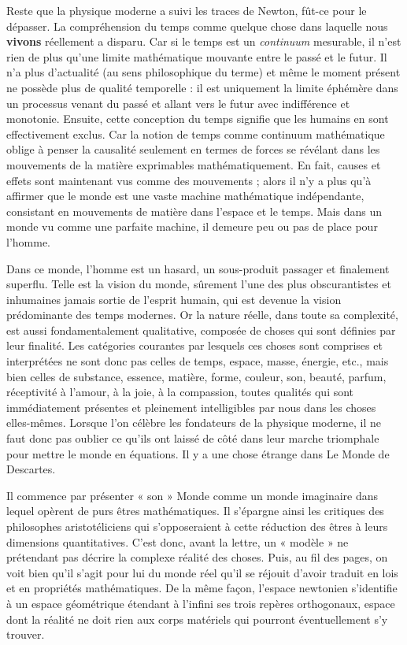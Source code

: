 \documentclass[a4paper,12pt]{article}
\begin{document}
Reste que la physique moderne a suivi les traces de Newton, fût-ce pour le dépasser. La compréhension du temps comme quelque chose dans laquelle nous  \textbf{vivons} réellement a disparu. Car si le temps est un  \textit{continuum} mesurable, il n'est rien de plus qu'une limite mathématique mouvante entre le passé et le futur. Il n'a plus d'actualité (au sens philosophique du terme) et même le moment présent ne possède plus de qualité temporelle : il est uniquement la limite éphémère dans un processus venant du passé et allant vers le futur avec indifférence et monotonie. Ensuite, cette conception du temps signifie que les humains en sont effectivement exclus. Car la notion de temps comme continuum mathématique oblige à penser la causalité seulement en termes de forces se révélant dans les mouvements de la matière exprimables mathématiquement. En fait, causes et effets sont maintenant vus comme des mouvements ; alors il n'y a plus qu'à affirmer que le monde est une vaste machine mathématique indépendante, consistant en mouvements de matière dans l'espace et le temps. Mais dans un monde vu comme une parfaite machine, il demeure peu ou pas de place pour l'homme.

Dans ce monde, l'homme est un hasard, un sous-produit passager et finalement superflu. Telle est la vision du monde, sûrement l'une des plus obscurantistes et inhumaines jamais sortie de l'esprit humain, qui est devenue la vision prédominante des temps modernes. Or la nature réelle, dans toute sa complexité, est aussi fondamentalement qualitative, composée de choses qui sont définies par leur finalité. Les catégories courantes par lesquels ces choses sont comprises et interprétées ne sont donc pas celles de temps, espace, masse, énergie, etc., mais bien celles de substance, essence, matière, forme, couleur, son, beauté, parfum, réceptivité à l'amour, à la joie, à la compassion, toutes qualités qui sont immédiatement présentes et pleinement intelligibles par nous dans les choses elles-mêmes. Lorsque l’on célèbre les fondateurs de la physique moderne, il ne faut donc pas oublier ce qu’ils ont laissé de côté dans leur marche triomphale pour mettre le monde en équations. Il y a une chose étrange dans Le Monde de Descartes. 

Il commence par présenter « son » Monde comme un monde imaginaire dans lequel opèrent de purs êtres mathématiques. Il s'épargne ainsi les critiques des philosophes aristotéliciens qui s'opposeraient à cette réduction des êtres à leurs dimensions quantitatives. C'est donc, avant la lettre, un « modèle » ne prétendant pas décrire la complexe réalité des choses. Puis, au fil des pages, on voit bien qu'il s'agit pour lui du monde réel qu’il se réjouit d'avoir traduit en lois et en propriétés mathématiques. De la même façon, l'espace newtonien s'identifie à un espace géométrique étendant à l'infini ses trois repères orthogonaux, espace dont la réalité ne doit rien aux corps matériels qui pourront éventuellement s’y trouver.
\end{document}
